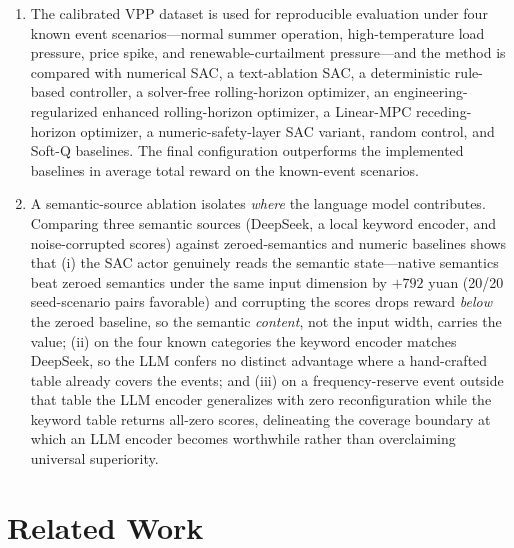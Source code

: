 \documentclass{ieeeaccess}
\begin{document}
\begin{enumerate}
  \item The calibrated VPP dataset is used for reproducible evaluation under four known event scenarios---normal summer operation, high-temperature load pressure, price spike, and renewable-curtailment pressure---and the method is compared with numerical SAC, a text-ablation SAC, a deterministic rule-based controller, a solver-free rolling-horizon optimizer, an engineering-regularized enhanced rolling-horizon optimizer, a Linear-MPC receding-horizon optimizer, a numeric-safety-layer SAC variant, random control, and Soft-Q baselines. The final configuration outperforms the implemented baselines in average total reward on the known-event scenarios.
  \item A semantic-source ablation isolates \emph{where} the language model contributes. Comparing three semantic sources (DeepSeek, a local keyword encoder, and noise-corrupted scores) against zeroed-semantics and numeric baselines shows that (i) the SAC actor genuinely reads the semantic state---native semantics beat zeroed semantics under the same input dimension by $+792$ yuan (20/20 seed-scenario pairs favorable) and corrupting the scores drops reward \emph{below} the zeroed baseline, so the semantic \emph{content}, not the input width, carries the value; (ii) on the four known categories the keyword encoder matches DeepSeek, so the LLM confers no distinct advantage where a hand-crafted table already covers the events; and (iii) on a frequency-reserve event outside that table the LLM encoder generalizes with zero reconfiguration while the keyword table returns all-zero scores, delineating the coverage boundary at which an LLM encoder becomes worthwhile rather than overclaiming universal superiority.
\end{enumerate}

\section{Related Work}
\label{sec:related}
\end{document}
